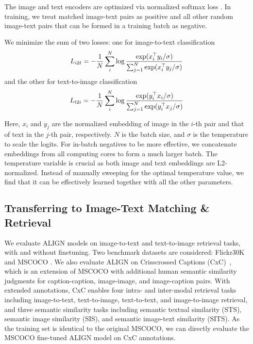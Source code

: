 \documentclass{article}
\begin{document}
The image and text encoders are optimized via normalized softmax loss \cite{zhai:norm_softmax}. In training, we treat matched image-text pairs as positive and all other random image-text pairs that can be formed in a training batch as negative.

We minimize the sum of two losses: one for image-to-text classification
\vspace{-0.2cm}
\begin{equation}\label{eq:i2t_loss}
\small
    L_{i2t} = -\frac{1}{N}\sum_i^N\log{\frac{\exp(x_i^\top y_i / \sigma)}{\sum_{j=1}^{N} \exp(x_i^\top y_j / \sigma)}}
\end{equation}
\vspace{-0.2cm}
and the other for text-to-image classification
\begin{equation}\label{eq:t2i_loss}
\small
    L_{t2i} = -\frac{1}{N}\sum_i^N\log{\frac{\exp(y_i^\top x_i / \sigma)}{\sum_{j=1}^{N} \exp(y_i^\top x_j / \sigma)}}
\end{equation}
\vspace{-0.4cm}

Here, $x_i$ and $y_j$ are the normalized embedding of image in the $i$-th pair and that of text in the $j$-th pair, respectively. $N$ is the  batch size, and $\sigma$ is the temperature to scale the logits. For in-batch negatives to be more effective, we concatenate embeddings from all computing cores to form a much larger batch. The temperature variable is crucial as both image and text embeddings are L2-normalized. Instead of manually sweeping for the optimal temperature value, we find that it can be effectively learned together with all the other parameters.

\vspace{-0.2cm}
\subsection{Transferring to Image-Text Matching \& Retrieval}

We evaluate ALIGN models on image-to-text and text-to-image retrieval tasks, with and without finetuning. Two benchmark datasets are considered: Flickr30K \cite{plummer:flickr30k} and MSCOCO \cite{chen:coco}. %
We also evaluate ALIGN on Crisscrossed Captions (CxC)~\cite{parekh:cxc}, which is an extension of MSCOCO with additional human semantic similarity judgments for caption-caption, image-image, and image-caption pairs.
With extended annotations, CxC enables four intra- and inter-modal retrieval tasks including image-to-text, text-to-image, text-to-text, and image-to-image retrieval, and three semantic similarity tasks including semantic textual similarity (STS), semantic image similarity (SIS), and semantic image-text similarity (SITS). 
As the training set is identical to the original MSCOCO, we can directly evaluate the MSCOCO fine-tuned ALIGN model on CxC annotations.
\vspace{-0.2cm}
\end{document}
